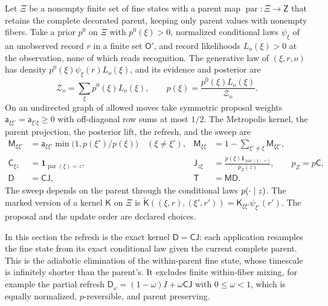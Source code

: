Let $\Xi$ be a nonempty finite set of fine states with a parent map
$\operatorname{par}:\Xi\to\mathsf Z$ that retains the complete decorated parent,
keeping only parent values with nonempty fibers. Take a prior $p^0$ on $\Xi$
with $p^0(\xi)>0$, normalized conditional laws $\psi_\xi$ of an unobserved record
$r$ in a finite set $\mathsf O'$, and record likelihoods $L_o(\xi)>0$ at the
observation, none of which reads recognition. The generative law of $(\xi,r,o)$
has density $p^0(\xi)\psi_\xi(r)L_o(\xi)$, and its evidence and posterior are
\begin{equation}
\mathcal Z_o=\sum_\xi p^0(\xi)L_o(\xi),
\qquad
p(\xi)=\frac{p^0(\xi)L_o(\xi)}{\mathcal Z_o}.
\label{eq:rg-memory-target}
\end{equation}
On an undirected graph of allowed moves take symmetric proposal weights
$\mathsf a_{\xi\xi'}=\mathsf a_{\xi'\xi}\geq0$ with off-diagonal row sums at most
$1/2$. The Metropolis kernel, the parent projection, the posterior lift, the
refresh, and the sweep are
\begin{equation}
\begin{aligned}
\mathsf M_{\xi\xi'}&=\mathsf a_{\xi\xi'}\min\bigl(1,p(\xi')/p(\xi)\bigr)\quad(\xi\ne\xi'),
&\mathsf M_{\xi\xi}&=1-\sum_{\xi'\ne\xi}\mathsf M_{\xi\xi'},\\
\mathsf C_{\xi z}&=\mathbf 1_{\operatorname{par}(\xi)=z},
&\mathsf J_{z\xi}&=\frac{p(\xi)\mathbf 1_{\operatorname{par}(\xi)=z}}{p_Z(z)},
\qquad p_Z=p\mathsf C,\\
\mathsf D&=\mathsf C\mathsf J,
&\mathsf T&=\mathsf M\mathsf D.
\end{aligned}
\label{eq:rg-memory-sweep}
\end{equation}
The sweep depends on the parent through the conditional laws $p(\cdot\mid z)$. The
marked version of a kernel $\mathsf K$ on
$\Xi$ is $\widetilde{\mathsf K}((\xi,r),(\xi',r'))=\mathsf K_{\xi\xi'}\psi_{\xi'}(r')$.
The proposal and the update order are declared choices.

In this section the refresh is the exact kernel $\mathsf D=\mathsf C\mathsf J$:
each application resamples the fine state from its exact conditional law given
the current complete parent. This is the adiabatic elimination of the
within-parent fine state, whose timescale is infinitely shorter than the parent's.
It excludes finite
within-fiber mixing, for example the partial refresh
$\mathsf D_\omega=(1-\omega)I+\omega\mathsf C\mathsf J$ with $0\leq\omega<1$, which
is equally normalized, $p$-reversible, and parent preserving.


